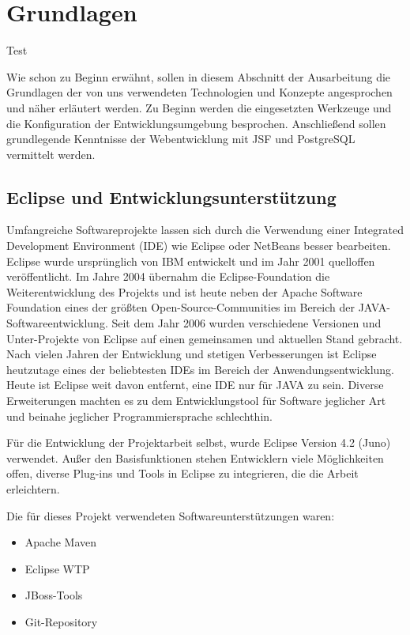 \section{Grundlagen}\label{sec:Grundlagen}

Test

Wie schon zu Beginn erwähnt, sollen in diesem Abschnitt der Ausarbeitung die Grundlagen der von uns verwendeten Technologien und Konzepte angesprochen und näher erläutert werden. Zu Beginn werden die eingesetzten Werkzeuge und die Konfiguration der Entwicklungsumgebung besprochen. Anschließend sollen grundlegende Kenntnisse der Webentwicklung mit \ac{JSF} und PostgreSQL vermittelt werden.

\subsection{Eclipse und Entwicklungsunterstützung}
Umfangreiche Softwareprojekte lassen sich durch die Verwendung einer \gls{Integrated Development Environment} (IDE) wie \gls{Eclipse} oder \gls{NetBeans} besser bearbeiten. 
Eclipse wurde ursprünglich von IBM entwickelt und im Jahr 2001 quelloffen veröffentlicht. Im Jahre 2004 übernahm die \gls{Eclipse-Foundation} die Weiterentwicklung des Projekts und ist heute neben der \gls{Apache Software Foundation} eines der größten Open-Source-Communities im Bereich der JAVA-Softwareentwicklung.
Seit dem Jahr 2006 wurden verschiedene Versionen und Unter-Projekte von Eclipse auf einen gemeinsamen und aktuellen Stand gebracht.
Nach vielen Jahren der Entwicklung und stetigen Verbesserungen ist Eclipse heutzutage eines der beliebtesten IDEs im Bereich der Anwendungsentwicklung.
Heute ist Eclipse weit davon entfernt, eine IDE nur für JAVA zu sein. Diverse Erweiterungen machten es zu dem Entwicklungstool für Software jeglicher Art und beinahe jeglicher Programmiersprache schlechthin.

Für die Entwicklung der Projektarbeit selbst, wurde Eclipse Version 4.2 (Juno) verwendet.
Außer den Basisfunktionen stehen Entwicklern viele Möglichkeiten offen, diverse Plug-ins und Tools in Eclipse zu integrieren, die die Arbeit erleichtern.

Die für dieses Projekt verwendeten Softwareunterstützungen waren:
\begin{itemize}
	\item \gls{Apache Maven}
	\item Eclipse \ac{WTP}
	\item JBoss-Tools
	\item Git-Repository
\end{itemize}
  
